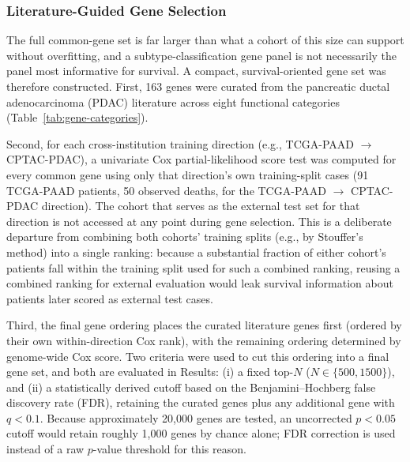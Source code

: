 \subsubsection{Literature-Guided Gene Selection}

The full common-gene set is far larger than what a cohort of this size can
support without overfitting, and a subtype-classification gene panel is not
necessarily the panel most informative for survival. A compact,
survival-oriented gene set was therefore constructed. First, 163 genes were
curated from the pancreatic ductal adenocarcinoma (PDAC) literature across
eight functional categories (Table~\ref{tab:gene-categories}).

Second, for each cross-institution training direction (e.g.,
TCGA-PAAD $\rightarrow$ CPTAC-PDAC), a univariate Cox partial-likelihood score
test was computed for every common gene using only that direction's own
training-split cases (91 TCGA-PAAD patients, 50 observed deaths, for the
TCGA-PAAD $\rightarrow$ CPTAC-PDAC direction). The cohort that serves as the
external test set for that direction is not accessed at any point during gene
selection. This is a deliberate departure from combining both cohorts' training
splits (e.g., by Stouffer's method) into a single ranking: because a
substantial fraction of either cohort's patients fall within the training
split used for such a combined ranking, reusing a combined ranking for external
evaluation would leak survival information about patients later scored as
external test cases.

Third, the final gene ordering places the curated literature genes first
(ordered by their own within-direction Cox rank), with the remaining ordering
determined by genome-wide Cox score. Two criteria were used to cut this
ordering into a final gene set, and both are evaluated in Results: (i) a fixed
top-$N$ ($N \in \{500, 1500\}$), and (ii) a statistically derived cutoff based
on the Benjamini--Hochberg false discovery rate (FDR), retaining the curated
genes plus any additional gene with $q < 0.1$. Because approximately 20,000
genes are tested, an uncorrected $p<0.05$ cutoff would retain roughly 1,000
genes by chance alone; FDR correction is used instead of a raw $p$-value
threshold for this reason.

